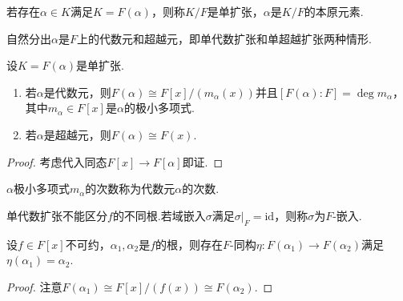 \begin{definition}
    若存在$\alpha\in K$满足$K=F(\alpha)$，则称$K/F$是{\heiti 单扩张}，$\alpha$是$K/F$的{\heiti 本原元素}.
\end{definition}

自然分出$\alpha$是$F$上的代数元和超越元，即{\heiti 单代数扩张}和{\heiti 单超越扩张}两种情形.
\begin{prop}
    设$K=F(\alpha)$是单扩张.
    \begin{enumerate}
        \item 若$\alpha$是代数元，则$F(\alpha)\cong F[x]/(m_\alpha(x))$并且$[F(\alpha):F]=\deg m_\alpha$，其中$m_\alpha\in F[x]$是$\alpha$的极小多项式.
        \item 若$\alpha$是超越元，则$F(\alpha)\cong F(x)$.
    \end{enumerate}
\end{prop}
\begin{proof}
    考虑代入同态$F[x]\to F[\alpha]$即证.
\end{proof}
\begin{remark}
    $\alpha$极小多项式$m_\alpha$的次数称为代数元$\alpha$的{\heiti 次数}.
\end{remark}

单代数扩张不能区分$f$的不同根.若域嵌入$\sigma$满足$\sigma|_F=\mathrm{id}$，则称$\sigma$为$F$-{\heiti 嵌入}.
\begin{prop}
    设$f\in F[x]$不可约，$\alpha_1,\alpha_2$是$f$的根，则存在$F$-同构$\eta\colon F(\alpha_1)\to F(\alpha_2)$满足$\eta(\alpha_1)=\alpha_2$.
\end{prop}
\begin{proof}
    注意$F(\alpha_1)\cong F[x]/(f(x))\cong F(\alpha_2)$.
\end{proof}

